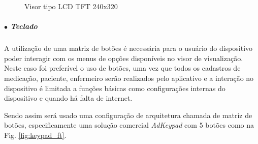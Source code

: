         \begin{figure}[H]
        \centering
        \hspace{0.1\textwidth}
        \caption{Visor tipo LCD TFT 240x320}
        \label{fig:display_lcd}
        \end{figure}
        
        \subparagraph*{$\bullet$ \textbf{Teclado}} \hfill
        
        A utilização de uma matriz de botões é necessária para o usuário do dispositivo poder interagir com os menus de opções disponíveis no visor de visualização. Neste caso foi preferível o uso de botões, uma vez que todos os cadastros de medicação, paciente, enfermeiro serão realizados pelo aplicativo e a interação no dispositivo é limitada a funções básicas como configurações internas do dispositivo e quando há falta de internet. 
        
        
        Sendo assim será usado uma configuração de arquitetura chamada de matriz de botões, especificamente uma solução comercial \textit{AdKeypad} com 5 botões como na Fig. \ref{fig:keypad_ft}.
        
